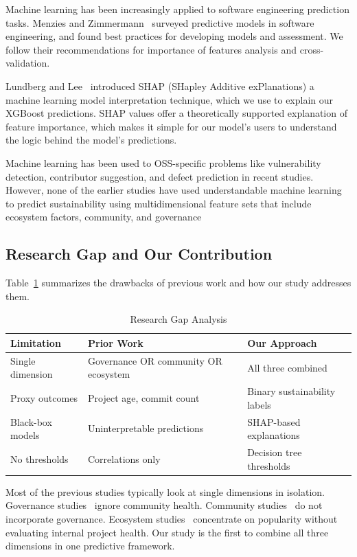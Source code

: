 \documentclass[conference]{IEEEtran}
\begin{document}
Machine learning has been increasingly applied to software engineering prediction tasks. Menzies and Zimmermann~\cite{menzies2013} surveyed predictive models in software engineering, and found best practices for developing models and assessment. We follow their recommendations for importance of features analysis and cross-validation.

Lundberg and Lee~\cite{lundberg2017} introduced SHAP (SHapley Additive exPlanations) a machine learning model interpretation technique, which we use to explain our XGBoost predictions. SHAP values offer a theoretically supported explanation of feature importance, which makes it simple for our model's users to understand the logic behind the model's predictions.

Machine learning has been used to OSS-specific problems like vulnerability detection, contributor suggestion, and defect prediction in recent studies. However, none of the earlier studies have used understandable machine learning to predict sustainability using multidimensional feature sets that include ecosystem factors, community, and governance 

\subsection{Research Gap and Our Contribution}

Table~\ref{tab:gap} summarizes the drawbacks of previous work and how our study addresses them.

\begin{table}[htbp]
\centering
\caption{Research Gap Analysis}
\label{tab:gap}
\begin{tabular}{@{}p{2.5cm}p{2.0cm}p{2.5cm}@{}}
\toprule
\textbf{Limitation} & \textbf{Prior Work} & \textbf{Our Approach} \\
\midrule
Single dimension & Governance OR community OR ecosystem & All three combined \\
\addlinespace
Proxy outcomes & Project age, commit count & Binary sustainability labels \\
\addlinespace
Black-box models & Uninterpretable predictions & SHAP-based explanations \\
\addlinespace
No thresholds & Correlations only & Decision tree thresholds \\
\bottomrule
\end{tabular}
\end{table}

Most of the previous studies typically look at  single dimensions in isolation. Governance studies~\cite{schweik2012,omahony2007} ignore community health. Community studies~\cite{avelino2016,goggins2021} do not incorporate governance. Ecosystem studies~\cite{borges2016,valiev2018} concentrate on popularity without evaluating internal project health. Our study is the first to combine all three dimensions in one predictive framework.
\end{document}
